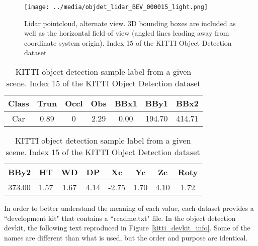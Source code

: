 \begin{figure}[H]
    \texttt{[image: ../media/objdet\_lidar\_BEV\_000015\_light.png]}
    \caption{Lidar pointcloud, alternate view. 3D bounding boxes are included as well as the horizontal field of view (angled lines leading away from coordinate system origin). Index 15 of the KITTI Object Detection dataset}
    \label{objdet_lidar_sample}
\end{figure}

\def \DEG{$^{\circ}$} %

\begin{table}[H]
	\centering
	\caption{KITTI object detection sample label from a given scene. Index 15 of the KITTI Object Detection dataset}
	\footnotesize
\begin{tabular}{|c|c|c|c|c|c|c|}
	\hline
	Class & Trun & Occl & Obs  & BBx1  & BBy1   & BBx2  \\
	\hline
	Car   & 0.89       & 0         & 2.29 & 0.00  & 194.70 & 414.71 \\
	\hline
\end{tabular}
\begin{tabular}{|c|c|c|c|c|c|c|c|}
	\hline
	BBy2   & HT   & WD   & DP   & Xc    & Yc   & Zc   & Roty \\
	\hline
	373.00 & 1.57 & 1.67 & 4.14 & -2.75 & 1.70 & 4.10 & 1.72 \\
	\hline
\end{tabular}
\label{kitti_label_sample}
\end{table}

In order to better understand the meaning of each value, each dataset provides a ``development kit" that contains a ``readme.txt" file. In the object detection devkit, the following text reproduced in Figure \ref{kitti_devkit_info}. Some of the names are different than what is used, but the order and purpose are identical.

